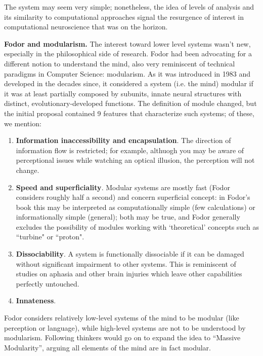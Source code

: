 \documentclass[../main.tex]{subfiles}
\begin{document}
The system may seem very simple; nonetheless, the idea of levels of analysis and its similarity to computational approaches signal the resurgence of interest in computational neuroscience that was on the horizon.

\vspace{4pt}
\textbf{Fodor and modularism.}
The interest toward lower level systems wasn't new, especially in the philosophical side of research. Fodor had been advocating for a different notion to understand the mind, also very reminiscent of technical paradigms in Computer Science: modularism. As it was introduced in 1983\cite{fodorModularityMind1983} and developed in the decades since, it considered a system (i.e. the mind) modular if it was at least partially composed by subunits, innate neural structures with distinct, evolutionary-developed functions. The definition of module changed, but the initial proposal contained 9 features that characterize such systems; of these, we mention:
\begin{enumerate}
    \item \textbf{Information inaccessibility and encapsulation}. The direction of information flow is restricted; for example, althuogh you may be aware of perceptional issues while watching an optical illusion, the perception will not change.
    \item \textbf{Speed and superficiality}. Modular systems are mostly fast (Fodor considers roughly half a second) and concern superficial concept: in Fodor's book this may be interpreted as computationally simple (few calculations) or informationally simple (general); both may be true, and Fodor generally excludes the possibility of modules working with `theoretical' concepts such as ``turbine" or ``proton".
    \item \textbf{Dissociability}. A system is functionally dissociable if it can be damaged without significant impairment to other systems. This is reminiscent of studies on aphasia and other brain injuries which leave other capabilities perfectly untouched.
    \item \textbf{Innateness}.
\end{enumerate}
Fodor considers relatively low-level systems of the mind to be modular (like perception or language), while high-level systems are not to be understood by modularism. Following thinkers would go on to expand the idea to ``Massive Modularity'', arguing all elements of the mind are in fact modular.
\end{document}
